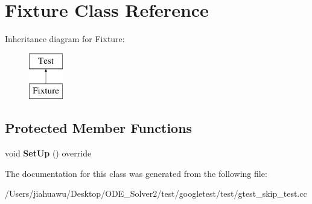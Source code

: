 \hypertarget{class_fixture}{}\section{Fixture Class Reference}
\label{class_fixture}
Inheritance diagram for Fixture\+:\begin{figure}[H]
\begin{center}
\leavevmode
\includegraphics[height=2.000000cm]{class_fixture}
\end{center}
\end{figure}
\subsection*{Protected Member Functions}
\begin{DoxyCompactItemize}
\item 
\mbox{\label{class_fixture_ad43066dc2f6aab4c4b4f0913e92f01f8}} 
void {\bfseries Set\+Up} () override
\end{DoxyCompactItemize}


The documentation for this class was generated from the following file\+:\begin{DoxyCompactItemize}
\item 
/\+Users/jiahuawu/\+Desktop/\+O\+D\+E\+\_\+\+Solver2/test/googletest/test/gtest\+\_\+skip\+\_\+test.\+cc\end{DoxyCompactItemize}
